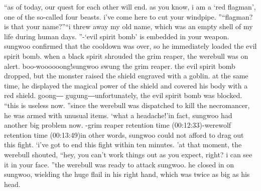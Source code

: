 “as of today, our quest for each other will end.
 as you know, i am a ‘red flagman’, one of the so-called four beasts.
 i’ve come here to cut your windpipe.
”“flagman? is that your name?”“i threw away my old name, which was an empty shell of my life during human days.
”-‘evil spirit bomb’ is embedded in your weapon.
sungwoo confirmed that the cooldown was over, so he immediately loaded the evil spirit bomb.
 when a black spirit shrouded the grim reaper, the werebull was on alert.
boo-woooooong!sungwoo swung the grim reaper.
 the evil spirit bomb dropped, but the monster raised the shield engraved with a goblin.
 at the same time, he displayed the magical power of the shield and covered his body with a red shield.
goong― gugung―unfortunately, the evil spirit bomb was blocked.
“this is useless now.
”since the werebull was dispatched to kill the necromancer, he was armed with unusual items.
‘what a headache!’in fact, sungwoo had another big problem now.
-grim reaper retention time (00:12:33)-werewolf retention time (00:13:49)in other words, sungwoo could not afford to drag out this fight.
‘i’ve got to end this fight within ten minutes.
’at that moment, the werebull shouted, “hey, you can’t work things out as you expect, right? i can see it in your face.
”the werebull was ready to attack sungwoo.
 he closed in on sungwoo, wielding the huge flail in his right hand, which was twice as big as his head.

